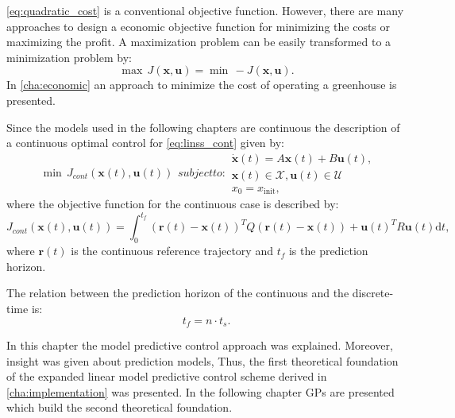 \eqref{eq:quadratic_cost} is a conventional objective function.
However, there are many approaches to design a economic objective function for minimizing the costs or maximizing the profit. 
A maximization problem can be easily transformed to a minimization problem by:
\begin{equation}\label{eq:minmaxJ}
\max \, J(\mathbf{x},\mathbf{u}) = \min \, -J(\mathbf{x},\mathbf{u}).
\end{equation}
In \cref{cha:economic} an approach to minimize the cost of operating a greenhouse is presented.

Since the models used in the following chapters are continuous the description of a continuous optimal control for \eqref{eq:linss_cont} given by:
\begin{subequations} \label{eq:description_conventional_mpc_cont}
\begin{align}
\min \, J_{cont}(\mathbf{x}(t),\mathbf{u}(t)) 
\end{align}
subject to:
\begin{align}
\dot{\mathbf{x}}(t) = A\mathbf{x}(t)+B\mathbf{u}(t),\\
\mathbf{x}(t) \in \mathcal{X}, \mathbf{u}(t)  \in \mathcal{U} \\
x_0 = x_{\text{init}},
\end{align}
\end{subequations}
where the objective function for the continuous case is described by:
\begin{equation}\label{eq:quadratic_cost_cont}
J_{cont}(\mathbf{x}(t),\mathbf{u}(t)) = \int_{0}^{t_f} \! (\mathbf{r}(t)-\mathbf{x}(t))^TQ(\mathbf{r}(t)-\mathbf{x}(t))+\mathbf{u}(t)^TR\mathbf{u}(t)\mathrm{d}t,
\end{equation}
where $\mathbf{r}(t)$ is the continuous reference trajectory and ${t_f}$ is the prediction horizon.

The relation between the prediction horizon of the continuous and the discrete-time is:
\begin{equation}\label{eq:rel_cont_dis}
t_f = n \cdot t_s.
\end{equation}
\par\medskip

In this chapter the model predictive control approach was explained.
Moreover, insight was given about prediction models, 
Thus, the first theoretical foundation of the expanded linear model predictive control scheme derived in \cref{cha:implementation} was presented.
In the following chapter GPs are presented which build the second theoretical foundation.

